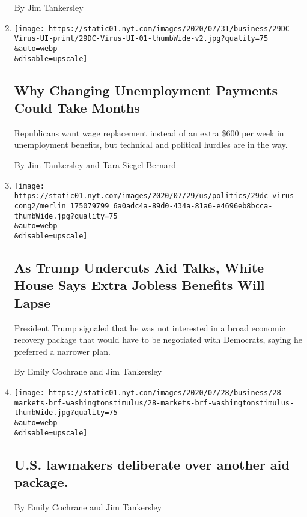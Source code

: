\begin{enumerate}
  By Jim Tankersley
\item
  \href{/2020/07/30/business/unemployment-payments-change.html}{}

  \texttt{[image: https://static01.nyt.com/images/2020/07/31/business/29DC-Virus-UI-print/29DC-Virus-UI-01-thumbWide-v2.jpg?quality=75\\\&auto=webp\\\&disable=upscale]}

  \hypertarget{why-changing-unemployment-payments-could-take-months}{%
  \subsection{Why Changing Unemployment Payments Could Take
  Months}\label{why-changing-unemployment-payments-could-take-months}}

  Republicans want wage replacement instead of an extra \$600 per week
  in unemployment benefits, but technical and political hurdles are in
  the way.

  By Jim Tankersley and Tara Siegel Bernard
\item
  \href{/2020/07/29/business/economy/virus-aid-trump.html}{}

  \texttt{[image: https://static01.nyt.com/images/2020/07/29/us/politics/29dc-virus-cong2/merlin\_175079799\_6a0adc4a-89d0-434a-81a6-e4696eb8bcca-thumbWide.jpg?quality=75\\\&auto=webp\\\&disable=upscale]}

  \hypertarget{as-trump-undercuts-aid-talks-white-house-says-extra-jobless-benefits-will-lapse}{%
  \subsection{As Trump Undercuts Aid Talks, White House Says Extra
  Jobless Benefits Will
  Lapse}\label{as-trump-undercuts-aid-talks-white-house-says-extra-jobless-benefits-will-lapse}}

  President Trump signaled that he was not interested in a broad
  economic recovery package that would have to be negotiated with
  Democrats, saying he preferred a narrower plan.

  By Emily Cochrane and Jim Tankersley
\item
  \href{/2020/07/28/business/us-lawmakers-deliberate-over-another-aid-package.html}{}

  \texttt{[image: https://static01.nyt.com/images/2020/07/28/business/28-markets-brf-washingtonstimulus/28-markets-brf-washingtonstimulus-thumbWide.jpg?quality=75\\\&auto=webp\\\&disable=upscale]}

  \hypertarget{us-lawmakers-deliberate-over-another-aid-package}{%
  \subsection{U.S. lawmakers deliberate over another aid
  package.}\label{us-lawmakers-deliberate-over-another-aid-package}}

  By Emily Cochrane and Jim Tankersley
\end{enumerate}

